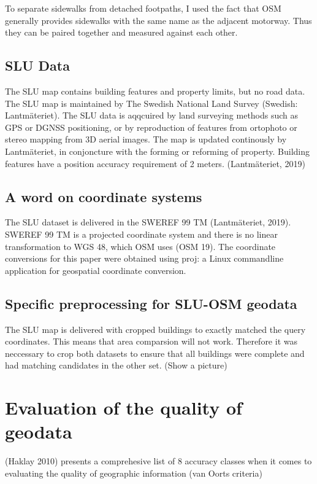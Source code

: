 \documentclass[a4paper]{article}
\begin{document}
To separate sidewalks from detached footpaths, I used the fact that OSM generally provides sidewalks with the same name as the adjacent motorway. Thus they can be paired together and measured against each other.

\subsection{SLU Data}

The SLU map contains building features and property limits, but no road data.
The SLU map is maintained by The Swedish National Land Survey (Swedish: Lantmäteriet).
The SLU data is aqqcuired by land surveying methods such as GPS or DGNSS positioning, or by reproduction of features from ortophoto or stereo mapping from 3D aerial images.
The map is updated continously by Lantmäteriet, in conjoncture with the forming or reforming of property.
Building features have a position accuracy requirement of 2 meters.
(Lantmäteriet, 2019)

\subsection{A word on coordinate systems}

The SLU dataset is delivered in the SWEREF 99 TM (Lantmäteriet, 2019). SWEREF 99 TM is a projected coordinate system and there is no linear transformation to WGS 48, which OSM uses (OSM 19). The coordinate conversions for this paper were obtained using proj: a Linux commandline application for geospatial coordinate conversion.

\subsection{Specific preprocessing for SLU-OSM geodata}

The SLU map is delivered with cropped buildings to exactly matched the query coordinates. This means that area comparsion will not work.
Therefore it was neccessary to crop both datasets to ensure that all buildings were complete and had matching candidates in the other set.
(Show a picture)

\section{Evaluation of the quality of geodata}

(Haklay 2010) presents a comprehesive list of 8 accuracy classes when it comes to evaluating the quality of geographic information (van Oorts criteria)
\end{document}
